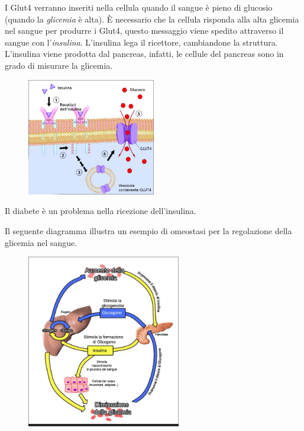 \documentclass[a4paper]{article}
\begin{document}
I Glut4 verranno inseriti nella cellula quando il sangue è pieno di glucosio (quando la \textit{glicemia} è alta).
È necessario che la cellula risponda alla alta glicemia nel sangue per produrre i Glut4,
questo messaggio viene spedito attraverso il sangue con l'\textit{insulina}.
L'insulina lega il ricettore, cambiandone la struttura. \\
L'insulina viene prodotta dal pancreas, infatti, le cellule del pancreas sono in grado di misurare la glicemia.
    
\begin{figure}[h]
    \centering
    \includegraphics[width=0.5\textwidth]{./insulin.png}
\end{figure}

Il diabete è un problema nella ricezione dell'insulina.


Il seguente diagramma illustra un esempio di omeostasi per la regolazione della glicemia nel sangue.

\begin{figure}[h]
    \centering
    \includegraphics[width=0.6\textwidth]{./omeostasi.png}
\end{figure}
\end{document}
